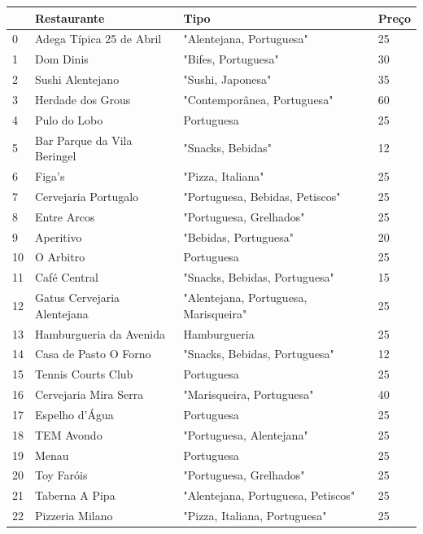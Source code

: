 \documentclass[a4paper,10pt]{article}
\begin{document}
\begin{table}[!ht]
  \centering
  \begin{tabular}{|l|l|l|l|}
  \hline
      ~ & Restaurante & Tipo & Preço \\ \hline
      0 & Adega Típica 25 de Abril & "Alentejana, Portuguesa" & 25 \\ \hline
      1 & Dom Dinis & "Bifes, Portuguesa" & 30 \\ \hline
      2 & Sushi Alentejano & "Sushi, Japonesa" & 35 \\ \hline
      3 & Herdade dos Grous & "Contemporânea, Portuguesa" & 60 \\ \hline
      4 & Pulo do Lobo & Portuguesa & 25 \\ \hline
      5 & Bar Parque da Vila Beringel & "Snacks, Bebidas" & 12 \\ \hline
      6 & Figa's & "Pizza, Italiana" & 25 \\ \hline
      7 & Cervejaria Portugalo & "Portuguesa, Bebidas, Petiscos" & 25 \\ \hline
      8 & Entre Arcos & "Portuguesa, Grelhados" & 25 \\ \hline
      9 & Aperitivo & "Bebidas, Portuguesa" & 20 \\ \hline
      10 & O Arbitro & Portuguesa & 25 \\ \hline
      11 & Café Central & "Snacks, Bebidas, Portuguesa" & 15 \\ \hline
      12 & Gatus Cervejaria Alentejana & "Alentejana, Portuguesa, Marisqueira" & 25 \\ \hline
      13 & Hamburgueria da Avenida & Hamburgueria & 25 \\ \hline
      14 & Casa de Pasto O Forno & "Snacks, Bebidas, Portuguesa" & 12 \\ \hline
      15 & Tennis Courts Club & Portuguesa & 25 \\ \hline
      16 & Cervejaria Mira Serra & "Marisqueira, Portuguesa" & 40 \\ \hline
      17 & Espelho d'Água & Portuguesa & 25 \\ \hline
      18 & TEM Avondo & "Portuguesa, Alentejana" & 25 \\ \hline
      19 & Menau & Portuguesa & 25 \\ \hline
      20 & Toy Faróis & "Portuguesa, Grelhados" & 25 \\ \hline
      21 & Taberna A Pipa & "Alentejana, Portuguesa, Petiscos" & 25 \\ \hline
      22 & Pizzeria Milano & "Pizza, Italiana, Portuguesa" & 25 \\ \hline

\end{tabular}
\end{table}
\end{document}
